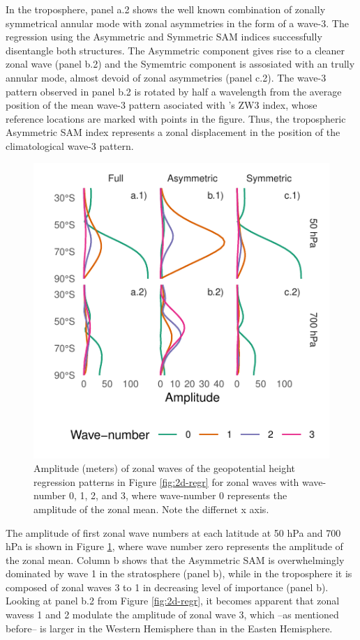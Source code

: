\documentclass[]{ametsocV5}
\begin{document}
In the troposphere, panel a.2 shows the well known combination of
zonally symmetrical annular mode with zonal asymmetries in the form of a
wave-3. The regression using the Asymmetric and Symmetric SAM indices
successfully disentangle both structures. The Asymmetric component gives
rise to a cleaner zonal wave (panel b.2) and the Symemtric component is
assosiated with an trully annular mode, almost devoid of zonal
asymmetries (panel c.2). The wave-3 pattern observed in panel b.2 is
rotated by half a wavelength from the average position of the mean
wave-3 pattern asociated with \citet{raphael2004}'s ZW3 index, whose
reference locations are marked with points in the figure. Thus, the
tropospheric Asymmetric SAM index represents a zonal displacement in the
position of the climatological wave-3 pattern.

\begin{figure}
\includegraphics{wave-amplitude-1} \caption{Amplitude (meters) of zonal waves of the geopotential height regression patterns in Figure \ref{fig:2d-regr} for zonal waves with wave-number 0, 1, 2, and 3, where wave-number 0 represents the amplitude of the zonal mean. Note the differnet x axis.}\label{fig:wave-amplitude}
\end{figure}

The amplitude of first zonal wave numbers at each latitude at 50 hPa and
700 hPa is shown in Figure \ref{fig:wave-amplitude}, where wave number
zero represents the amplitude of the zonal mean. Column b shows that the
Asymmetric SAM is overwhelmingly dominated by wave 1 in the stratosphere
(panel b), while in the troposphere it is composed of zonal waves 3 to 1
in decreasing level of importance (panel b). Looking at panel b.2 from
Figure \ref{fig:2d-regr}, it becomes apparent that zonal wavess 1 and 2
modulate the amplitude of zonal wave 3, which --as mentioned before-- is
larger in the Western Hemisphere than in the Easten Hemisphere.
\end{document}
